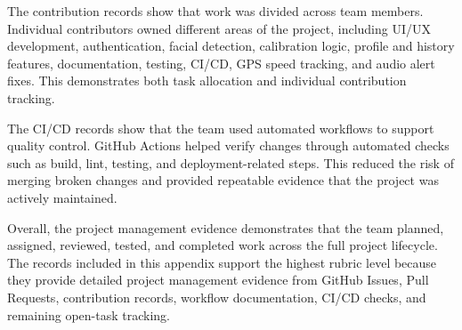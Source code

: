 \documentclass[11pt]{report}
\begin{document}
The contribution records show that work was divided across team members. Individual contributors owned different areas of the project, including UI/UX development, authentication, facial detection, calibration logic, profile and history features, documentation, testing, CI/CD, GPS speed tracking, and audio alert fixes. This demonstrates both task allocation and individual contribution tracking.

The CI/CD records show that the team used automated workflows to support quality control. GitHub Actions helped verify changes through automated checks such as build, lint, testing, and deployment-related steps. This reduced the risk of merging broken changes and provided repeatable evidence that the project was actively maintained.

Overall, the project management evidence demonstrates that the team planned, assigned, reviewed, tested, and completed work across the full project lifecycle. The records included in this appendix support the highest rubric level because they provide detailed project management evidence from GitHub Issues, Pull Requests, contribution records, workflow documentation, CI/CD checks, and remaining open-task tracking.
\end{document}
